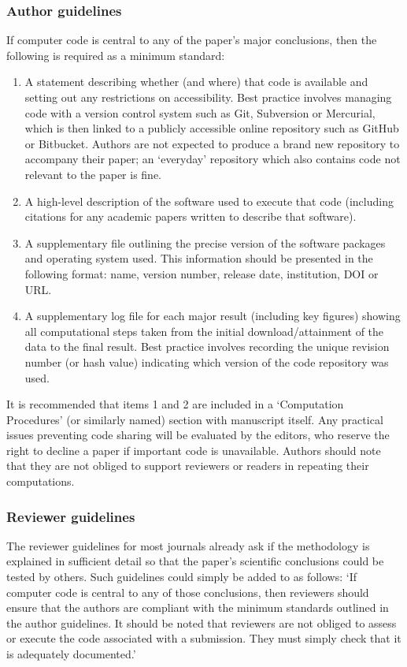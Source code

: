 \subsubsection{Author guidelines}

If computer code is central to any of the paper's major conclusions, then the following is required as a minimum standard: 
\begin{enumerate}
\item A statement describing whether (and where) that code is available and setting out any restrictions on accessibility. Best practice involves managing code with a version control system such as Git, Subversion or Mercurial, which is then linked to a publicly accessible online repository such as GitHub or Bitbucket. Authors are not expected to produce a brand new repository to accompany their paper; an `everyday' repository which also contains code not relevant to the paper is fine.  
\item A high-level description of the software used to execute that code (including citations for any academic papers written to describe that software).
\item A supplementary file outlining the precise version of the software packages and operating system used. This information should be presented in the following format: name, version number, release date, institution, DOI or URL.
\item A supplementary log file for each major result (including key figures) showing all computational steps taken from the initial download/attainment of the data to the final result. Best practice involves recording the unique revision number (or hash value) indicating which version of the code repository was used. 
\end{enumerate}

It is recommended that items 1 and 2 are included in a `Computation Procedures' (or similarly named) section with manuscript itself. Any practical issues preventing code sharing will be evaluated by the editors, who reserve the right to decline a paper if important code is unavailable. Authors should note that they are not obliged to support reviewers or readers in repeating their computations.

\subsubsection{Reviewer guidelines}

The reviewer guidelines for most journals already ask if the methodology is explained in sufficient detail so that the paper's scientific conclusions could be tested by others. Such guidelines could simply be added to as follows: `If computer code is central to any of those conclusions, then reviewers should ensure that the authors are compliant with the minimum standards outlined in the author guidelines. It should be noted that reviewers are not obliged to assess or execute the code associated with a submission. They must simply check that it is adequately documented.'   
  
 
    
  
  
  
  
  
  
  
  